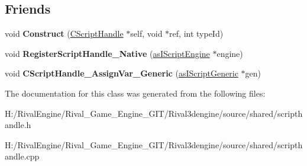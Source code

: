 \subsection*{Friends}
\begin{DoxyCompactItemize}
\item 
\mbox{\label{class_c_script_handle_a3fd241a2dfddeb98fe97625aa25b4d61}} 
void {\bfseries Construct} (\hyperlink{class_c_script_handle}{C\+Script\+Handle} $\ast$self, void $\ast$ref, int type\+Id)
\item 
\mbox{\label{class_c_script_handle_abf65d893951791abc272e367eb035c67}} 
void {\bfseries Register\+Script\+Handle\+\_\+\+Native} (\hyperlink{classas_i_script_engine}{as\+I\+Script\+Engine} $\ast$engine)
\item 
\mbox{\label{class_c_script_handle_a0be436efbb15a98a376520aa00583deb}} 
void {\bfseries C\+Script\+Handle\+\_\+\+Assign\+Var\+\_\+\+Generic} (\hyperlink{classas_i_script_generic}{as\+I\+Script\+Generic} $\ast$gen)
\end{DoxyCompactItemize}


The documentation for this class was generated from the following files\+:\begin{DoxyCompactItemize}
\item 
H\+:/\+Rival\+Engine/\+Rival\+\_\+\+Game\+\_\+\+Engine\+\_\+\+G\+I\+T/\+Rival3dengine/source/shared/scripthandle.\+h\item 
H\+:/\+Rival\+Engine/\+Rival\+\_\+\+Game\+\_\+\+Engine\+\_\+\+G\+I\+T/\+Rival3dengine/source/shared/scripthandle.\+cpp\end{DoxyCompactItemize}
